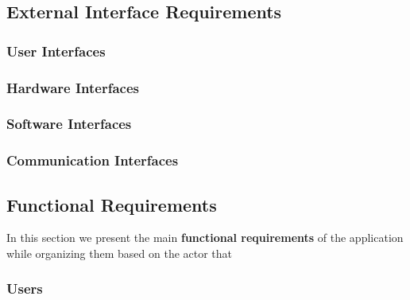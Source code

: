 \subsection{External Interface Requirements}
\subsubsection{User Interfaces}
\vspace{-6mm}

\subsubsection{Hardware Interfaces}

\subsubsection{Software Interfaces}

\subsubsection{Communication Interfaces}


\subsection{Functional Requirements}
In this section we present the main \textbf{functional requirements} of the application while organizing them based on the actor that 

\subsubsection{Users}
\label{sect:users_requirements}


